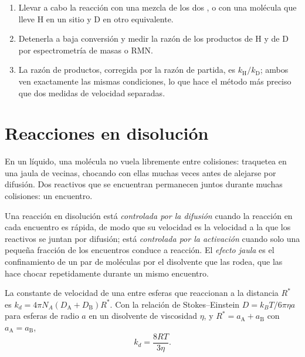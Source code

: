 \begin{method}\label{met:b3:rate-theories:kie}
\begin{enumerate}
  \item Llevar a cabo la reacción con una mezcla de los dos , o con una
        molécula que lleve H en un sitio y D en otro equivalente.
  \item Detenerla a baja conversión y medir la razón de los productos de H y de D por
        espectrometría de masas o RMN.
  \item La razón de productos, corregida por la razón de partida, es $k_{\mathrm H}/k_{\mathrm D}$; ambos
         ven exactamente las mismas condiciones, lo que hace el método
        más preciso que dos medidas de velocidad separadas.
\end{enumerate}
\end{method}

\section{Reacciones en disolución}

En un líquido, una molécula no vuela libremente entre colisiones: traquetea en una
jaula de vecinas, chocando con ellas muchas veces antes de alejarse por difusión.
Dos reactivos que se encuentran permanecen juntos durante muchas colisiones: un encuentro.

\begin{definition}\label{def:b3:rate-theories:diffusion}
Una reacción en disolución está \emph{controlada por la difusión}
cuando la reacción en cada encuentro es rápida, de modo que su velocidad es la velocidad
a la que los reactivos se juntan por difusión; está
\emph{controlada por la activación} cuando solo una pequeña
fracción de los encuentros conduce a reacción. El \emph{efecto jaula}
es el confinamiento de un par de moléculas por el disolvente que las rodea,
que las hace chocar repetidamente durante un mismo encuentro.
\end{definition}

\begin{proposition}\label{prop:b3:rate-theories:smoluchowski}
La constante de velocidad de una  entre esferas que reaccionan
a la distancia $R^*$ es $k_d = 4\pi N_A(D_{\mathrm A} + D_{\mathrm B})R^*$. Con la relación de Stokes--Einstein
$D = k_BT/6\pi\eta a$ para esferas de radio $a$ en un disolvente de viscosidad $\eta$,
y $R^* = a_{\mathrm A} + a_{\mathrm B}$ con $a_{\mathrm A} = a_{\mathrm B}$,
\[
  k_d = \frac{8RT}{3\eta} .
\]
\end{proposition}

